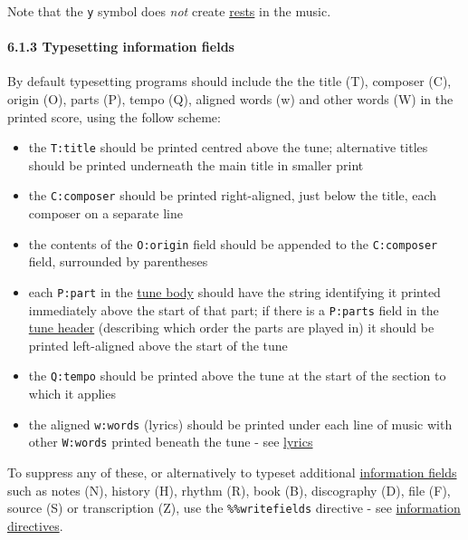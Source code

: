 \documentclass[oneside]{book}
\let\oldparagraph\paragraph
\renewcommand{\paragraph}[1]{\oldparagraph{#1}\mbox{}}
\begin{document}
Note that the \texttt{y} symbol does \emph{not} create
\protect\hyperlink{rests}{rests} in the music.

\hypertarget{typesetting_information_fields}{\paragraph{6.1.3
Typesetting information fields}\label{typesetting_information_fields}}

By default typesetting programs should include the the title (T),
composer (C), origin (O), parts (P), tempo (Q), aligned words (w) and
other words (W) in the printed score, using the follow scheme:

\begin{itemize}
\item
  the \texttt{T:title} should be printed centred above the tune;
  alternative titles should be printed underneath the main title in
  smaller print
\item
  the \texttt{C:composer} should be printed right-aligned, just below
  the title, each composer on a separate line
\item
  the contents of the \texttt{O:origin} field should be appended to the
  \texttt{C:composer} field, surrounded by parentheses
\item
  each \texttt{P:part} in the
  \protect\hyperlink{tune_body_definition}{tune body} should have the
  string identifying it printed immediately above the start of that
  part; if there is a \texttt{P:parts} field in the
  \protect\hyperlink{tune_header_definition}{tune header} (describing
  which order the parts are played in) it should be printed left-aligned
  above the start of the tune
\item
  the \texttt{Q:tempo} should be printed above the tune at the start of
  the section to which it applies
\item
  the aligned \texttt{w:words} (lyrics) should be printed under each
  line of music with other \texttt{W:words} printed beneath the tune -
  see \protect\hyperlink{lyrics}{lyrics}
\end{itemize}

To suppress any of these, or alternatively to typeset additional
\protect\hyperlink{information_field_definition}{information fields}
such as notes (N), history (H), rhythm (R), book (B), discography (D),
file (F), source (S) or transcription (Z), use the
\texttt{\%\%writefields} directive - see
\protect\hyperlink{information_directives}{information directives}.
\end{document}
